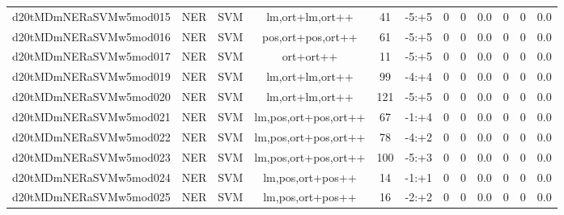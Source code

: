 \documentclass[a4paper]{article}
\begin{document}
\begin{landscape}
\begin{center}
\begin{tabular}{ |c|c|c|c|c|c|c|c|c|c|c|c|}
 
 	
 	\small{ d20tMDmNERaSVMw5mod015 } & \small{ NER} & \small{  SVM }  & lm,ort+lm,ort++  &  41 &  \small{  -5:+5 }  &  0 & 0 & 0.0  &  0 & 0 & 0.0 \\
 	

 
 	
 	\small{ d20tMDmNERaSVMw5mod016 } & \small{ NER} & \small{  SVM }  & pos,ort+pos,ort++  &  61 &  \small{  -5:+5 }  &  0 & 0 & 0.0  &  0 & 0 & 0.0 \\
 	

 
 	
 	\small{ d20tMDmNERaSVMw5mod017 } & \small{ NER} & \small{  SVM }  & ort+ort++  &  11 &  \small{  -5:+5 }  &  0 & 0 & 0.0  &  0 & 0 & 0.0 \\
 	

 
 	
 	\small{ d20tMDmNERaSVMw5mod019 } & \small{ NER} & \small{  SVM }  & lm,ort+lm,ort++  &  99 &  \small{  -4:+4 }  &  0 & 0 & 0.0  &  0 & 0 & 0.0 \\
 	

 
 	
 	\small{ d20tMDmNERaSVMw5mod020 } & \small{ NER} & \small{  SVM }  & lm,ort+lm,ort++  &  121 &  \small{  -5:+5 }  &  0 & 0 & 0.0  &  0 & 0 & 0.0 \\
 	

 
 	
 	\small{ d20tMDmNERaSVMw5mod021 } & \small{ NER} & \small{  SVM }  & lm,pos,ort+pos,ort++  &  67 &  \small{  -1:+4 }  &  0 & 0 & 0.0  &  0 & 0 & 0.0 \\
 	

 
 	
 	\small{ d20tMDmNERaSVMw5mod022 } & \small{ NER} & \small{  SVM }  & lm,pos,ort+pos,ort++  &  78 &  \small{  -4:+2 }  &  0 & 0 & 0.0  &  0 & 0 & 0.0 \\
 	

 
 	
 	\small{ d20tMDmNERaSVMw5mod023 } & \small{ NER} & \small{  SVM }  & lm,pos,ort+pos,ort++  &  100 &  \small{  -5:+3 }  &  0 & 0 & 0.0  &  0 & 0 & 0.0 \\
 	

 
 	
 	\small{ d20tMDmNERaSVMw5mod024 } & \small{ NER} & \small{  SVM }  & lm,pos,ort+pos++  &  14 &  \small{  -1:+1 }  &  0 & 0 & 0.0  &  0 & 0 & 0.0 \\
 	

 
 	
 	\small{ d20tMDmNERaSVMw5mod025 } & \small{ NER} & \small{  SVM }  & lm,pos,ort+pos++  &  16 &  \small{  -2:+2 }  &  0 & 0 & 0.0  &  0 & 0 & 0.0 \\
 	


\end{tabular}
\end{center}
\end{landscape}
\end{document}
